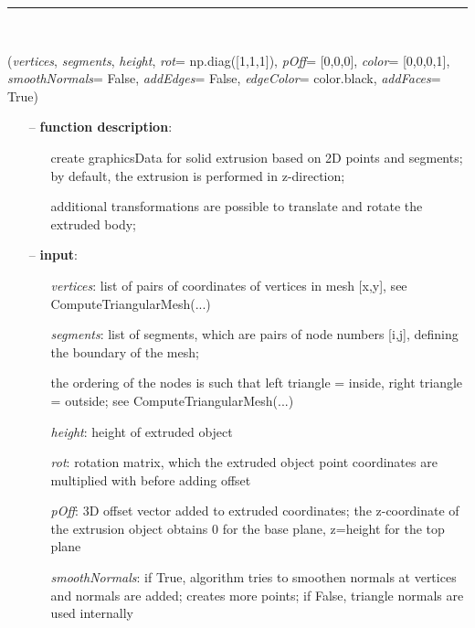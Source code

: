 \begin{itemize}[leftmargin=1.4cm]
\begin{itemize}[leftmargin=1.4cm]
\begin{itemize}[leftmargin=1.4cm]
\begin{itemize}[leftmargin=0.5cm]
\begin{itemize}[leftmargin=1.4cm]
\begin{itemize}[leftmargin=1.4cm]
\begin{itemize}[leftmargin=0.5cm]
\begin{itemize}[leftmargin=1.4cm]
%
\noindent\rule{8cm}{0.75pt}\vspace{1pt} \\ 
\begin{flushleft}
\label{sec:graphics:SolidExtrusion}
({\it vertices}, {\it segments}, {\it height}, {\it rot}= np.diag([1,1,1]), {\it pOff}= [0,0,0], {\it color}= [0,0,0,1], {\it smoothNormals}= False, {\it addEdges}= False, {\it edgeColor}= color.black, {\it addFaces}= True)
\end{flushleft}
\setlength{\itemindent}{0.7cm}
\begin{itemize}[leftmargin=0.7cm]
\item[--]
{\bf function description}: \vspace{-6pt}
\begin{itemize}[leftmargin=1.2cm]
\setlength{\itemindent}{-0.7cm}
\item[]create graphicsData for solid extrusion based on 2D points and segments; by default, the extrusion is performed in z-direction;
\item[]additional transformations are possible to translate and rotate the extruded body;
\end{itemize}
\item[--]
{\bf input}: \vspace{-6pt}
\begin{itemize}[leftmargin=1.2cm]
\setlength{\itemindent}{-0.7cm}
\item[]{\it vertices}: list of pairs of coordinates of vertices in mesh [x,y], see ComputeTriangularMesh(...)
\item[]{\it segments}: list of segments, which are pairs of node numbers [i,j], defining the boundary of the mesh;
\item[]the ordering of the nodes is such that left triangle = inside, right triangle = outside; see ComputeTriangularMesh(...)
\item[]{\it height}:   height of extruded object
\item[]{\it rot}:      rotation matrix, which the extruded object point coordinates are multiplied with before adding offset
\item[]{\it pOff}:     3D offset vector added to extruded coordinates; the z-coordinate of the extrusion object obtains 0 for the base plane, z=height for the top plane
\item[]{\it smoothNormals}: if True, algorithm tries to smoothen normals at vertices and normals are added; creates more points; if False, triangle normals are used internally

\end{itemize}
\end{itemize}
\end{itemize}
\end{itemize}
\end{itemize}
\end{itemize}
\end{itemize}
\end{itemize}
\end{itemize}
\end{itemize}
